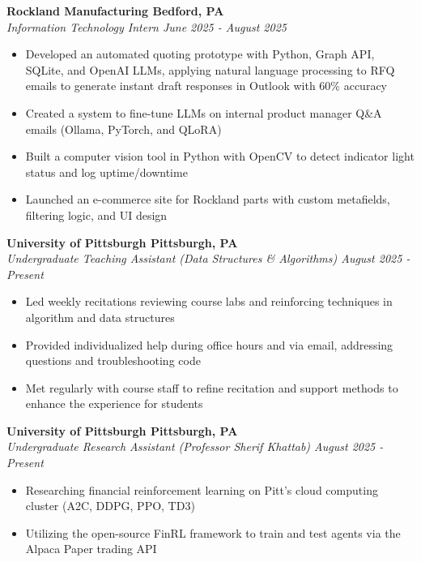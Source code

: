 \documentclass[11pt]{article}
\begin{document}
\begin{adjustwidth}{0.5em}{0em}
\textbf{Rockland Manufacturing \hfill Bedford, PA} \\
\textit{Information Technology Intern \hfill June 2025 - August 2025} 
\begin{itemize}[leftmargin=1.5em, itemsep=0em, topsep=0.2em]
    \item Developed an automated quoting prototype with Python, Graph API, SQLite, and OpenAI LLMs, applying natural language processing to RFQ emails to generate instant draft responses in Outlook with 60\% accuracy
    \item Created a system to fine-tune LLMs on internal product manager Q\&A emails (Ollama, PyTorch, and QLoRA)
    \item Built a computer vision tool in Python with OpenCV to detect indicator light status and log uptime/downtime
    \item Launched an e-commerce site for Rockland parts with custom metafields, filtering logic, and UI design
\end{itemize} 
\end{adjustwidth}

\vspace{0.1em}

\begin{adjustwidth}{0.5em}{0em}
\textbf{University of Pittsburgh \hfill Pittsburgh, PA} \\
\textit{Undergraduate Teaching Assistant (Data Structures \& Algorithms) \hfill August 2025 - Present}
\begin{itemize}[leftmargin=1.5em, itemsep=0em, topsep=0.2em]
    \item Led weekly recitations reviewing course labs and reinforcing techniques in algorithm and data structures
    \item Provided individualized help during office hours and via email, addressing questions and troubleshooting code
    \item Met regularly with course staff to refine recitation and support methods to enhance the experience for students
\end{itemize}    
\end{adjustwidth}

\vspace{0.1em}


\begin{adjustwidth}{0.5em}{0em}
\textbf{University of Pittsburgh \hfill Pittsburgh, PA} \\
\textit{Undergraduate Research Assistant (Professor Sherif Khattab) \hfill August 2025 - Present}
\begin{itemize}[leftmargin=1.5em, itemsep=0em, topsep=0.2em]
    \item Researching financial reinforcement learning on Pitt’s cloud computing cluster (A2C, DDPG, PPO, TD3)
    \item Utilizing the open-source FinRL framework to train and test agents via the Alpaca Paper trading API
\end{itemize}    
\end{adjustwidth}
\end{document}
